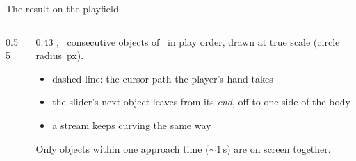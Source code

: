 \documentclass[aspectratio=169,11pt]{beamer}
\begin{document}
\begin{frame}{The result on the playfield}
  \begin{columns}[c]
    \begin{column}{0.55\textwidth}
      \centering
    \end{column}
    \begin{column}{0.43\textwidth}\small
      \textbf{\statTier}, \statPFCount\ consecutive objects of \SongFile\ in play order,
      drawn at true scale (circle radius \statPFRadius\,px).\\[0.6em]
      \begin{itemize}
        \item dashed line: the cursor path the player's hand takes
        \item the slider's next object leaves from its \emph{end}, off to one side of the body
        \item a stream keeps curving the same way
      \end{itemize}
      \medskip
      {\color{muted}Only objects within one approach time ($\sim$1\,s) are on screen together.}
    \end{column}
  \end{columns}
\end{frame}
\end{document}
